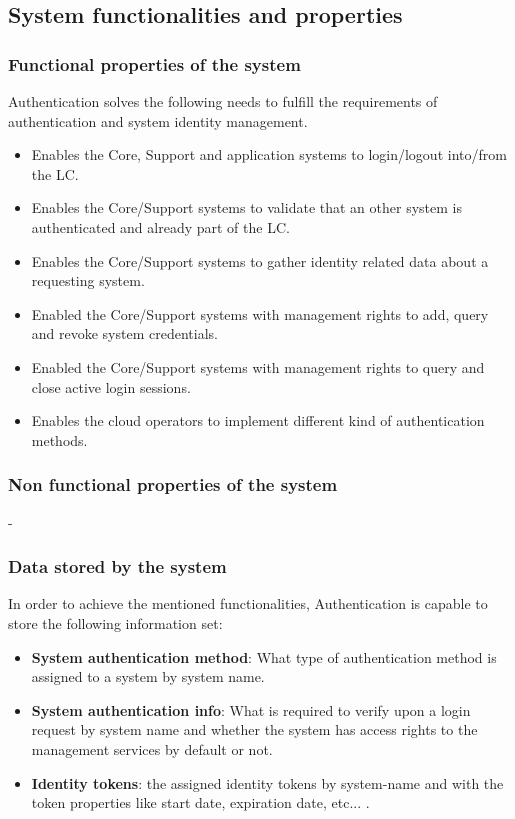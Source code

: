 \documentclass[a4paper]{arrowhead}
\begin{document}
\newpage

\subsection{System functionalities and properties}
\label{sec:properties}

\subsubsection {Functional properties of the system}

Authentication solves the following needs to fulfill the requirements of authentication and system identity management.

\begin{itemize}
    \item Enables the Core, Support and application systems to login/logout into/from the LC.
    \item Enables the Core/Support systems to validate that an other system is authenticated and already part of the LC.
    \item Enables the Core/Support systems to gather identity related data about a requesting system.
    \item Enabled the Core/Support systems with management rights to add, query and revoke system credentials.
    \item Enabled the Core/Support systems with management rights to query and close active login sessions.
    \item Enables the cloud operators to implement different kind of authentication methods.
\end{itemize}

\subsubsection {Non functional properties of the system}
-

\subsubsection {Data stored by the system}
In order to achieve the mentioned functionalities, Authentication is capable to store the following information set:

\begin{itemize}
    \item \textbf{System authentication method}: What type of authentication method is assigned to a system by system name.
    \item \textbf{System authentication info}: What is required to verify upon a login request by system name and whether the system has access rights to the management services by default or not.
    \item \textbf{Identity tokens}: the assigned identity tokens by system-name and with the token properties like start date, expiration date, etc... .
\end{itemize}
\end{document}
